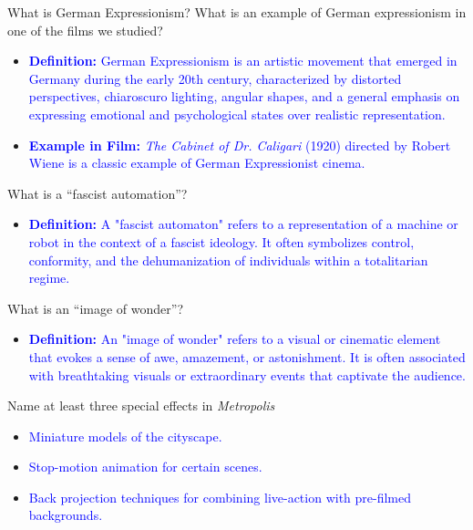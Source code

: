 \documentclass[11pt,fleqn]{book} %
\begin{document}
\begin{exercise}
    What is German Expressionism? What is an example of German expressionism in one of the films we studied?
    \begin{itemize}
        \item \textcolor{blue}{\textbf{Definition:} German Expressionism is an artistic movement that emerged in Germany during the early 20th century, characterized by distorted perspectives, chiaroscuro lighting, angular shapes, and a general emphasis on expressing emotional and psychological states over realistic representation.}
        \item \textcolor{blue}{\textbf{Example in Film:} \textit{The Cabinet of Dr. Caligari} (1920) directed by Robert Wiene is a classic example of German Expressionist cinema.}
    \end{itemize}
\end{exercise}

\begin{exercise}
    What is a \enquote{fascist automation}?
        \begin{itemize}
            \item \textcolor{blue}{\textbf{Definition:} A "fascist automaton" refers to a representation of a machine or robot in the context of a fascist ideology. It often symbolizes control, conformity, and the dehumanization of individuals within a totalitarian regime.}
        \end{itemize}
\end{exercise}

\begin{exercise}
    What is an \enquote{image of wonder}?
        \begin{itemize}
            \item \textcolor{blue}{\textbf{Definition:} An "image of wonder" refers to a visual or cinematic element that evokes a sense of awe, amazement, or astonishment. It is often associated with breathtaking visuals or extraordinary events that captivate the audience.}
        \end{itemize}
\end{exercise}

\begin{exercise}
    Name at least three special effects in \textit{Metropolis}
        \begin{itemize}
            \item \textcolor{blue}{Miniature models of the cityscape.}
            \item \textcolor{blue}{Stop-motion animation for certain scenes.}
            \item \textcolor{blue}{Back projection techniques for combining live-action with pre-filmed backgrounds.}
        \end{itemize}
\end{exercise}
\end{document}

